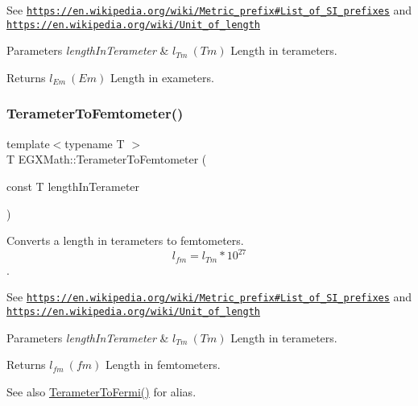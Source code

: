 See \href{https://en.wikipedia.org/wiki/Metric_prefix#List_of_SI_prefixes}{\tt https\+://en.\+wikipedia.\+org/wiki/\+Metric\+\_\+prefix\#\+List\+\_\+of\+\_\+\+S\+I\+\_\+prefixes} and \href{https://en.wikipedia.org/wiki/Unit_of_length}{\tt https\+://en.\+wikipedia.\+org/wiki/\+Unit\+\_\+of\+\_\+length} 
\begin{DoxyParams}{Parameters}
{\em length\+In\+Terameter} & $ l_{Tm}\ (Tm)$ Length in terameters. \\
\hline
\end{DoxyParams}
\begin{DoxyReturn}{Returns}
$ l_{Em}\ (Em)$ Length in exameters. 
\end{DoxyReturn}
\mbox{\label{group___e_g_x_math-_conversions-_length_conversions-_s_i-_terameter-_s_i_ga3baa4e53ebd4305bc80d9b998720eba5}} 
\subsubsection{\texorpdfstring{Terameter\+To\+Femtometer()}{TerameterToFemtometer()}}
{\footnotesize\ttfamily template$<$typename T $>$ \\
T E\+G\+X\+Math\+::\+Terameter\+To\+Femtometer (\begin{DoxyParamCaption}\item[{const T}]{length\+In\+Terameter }\end{DoxyParamCaption})}



Converts a length in terameters to femtometers. \[ l_{fm}=l_{Tm} * 10^{27} \]. 

See \href{https://en.wikipedia.org/wiki/Metric_prefix#List_of_SI_prefixes}{\tt https\+://en.\+wikipedia.\+org/wiki/\+Metric\+\_\+prefix\#\+List\+\_\+of\+\_\+\+S\+I\+\_\+prefixes} and \href{https://en.wikipedia.org/wiki/Unit_of_length}{\tt https\+://en.\+wikipedia.\+org/wiki/\+Unit\+\_\+of\+\_\+length} 
\begin{DoxyParams}{Parameters}
{\em length\+In\+Terameter} & $ l_{Tm}\ (Tm)$ Length in terameters. \\
\hline
\end{DoxyParams}
\begin{DoxyReturn}{Returns}
$ l_{fm}\ (fm)$ Length in femtometers. 
\end{DoxyReturn}
\begin{DoxySeeAlso}{See also}
\mbox{\hyperlink{group___e_g_x_math-_conversions-_length_conversions-_s_i-_terameter-_non-_s_i_ga5bf639553e4b6e8520f9345def06e492}{Terameter\+To\+Fermi()}} for alias. 
\end{DoxySeeAlso}
\mbox{\label{group___e_g_x_math-_conversions-_length_conversions-_s_i-_terameter-_s_i_gaf7d05e4ba6ba85ee7c75c65647178cb8}} 
